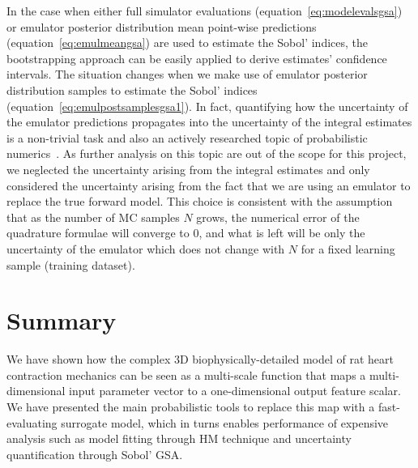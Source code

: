 \vspace{0.2cm}\noindent
In the case when either full simulator evaluations (equation~\eqref{eq:modelevalsgsa}) or emulator posterior distribution mean point-wise predictions (equation~\eqref{eq:emulmeangsa}) are used to estimate the Sobol' indices, the bootstrapping approach can be easily applied to derive estimates' confidence intervals. The situation changes when we make use of emulator posterior distribution samples to estimate the Sobol' indices (equation~\eqref{eq:emulpostsamplesgsa1}). In fact, quantifying how the uncertainty of the emulator predictions propagates into the uncertainty of the integral estimates is a non-trivial task and also an actively researched topic of probabilistic numerics~\cite{Hennig:2015,Oates:2017,Cockayne:2019,Fisher:2019}. As further analysis on this topic are out of the scope for this project, we neglected the uncertainty arising from the integral estimates and only considered the uncertainty arising from the fact that we are using an emulator to replace the true forward model. This choice is consistent with the assumption that as the number of MC samples $N$ grows, the numerical error of the quadrature formulae will converge to $0$, and what is left will be only the uncertainty of the emulator which does not change with $N$ for a fixed learning sample (training dataset).


%
%
%
\section{Summary}\label{sec:ch3summary}
We have shown how the complex $3$D biophysically-detailed model of rat heart contraction mechanics can be seen as a multi-scale function that maps a multi-dimensional input parameter vector to a one-dimensional output feature scalar. We have presented the main probabilistic tools to replace this map with a fast-evaluating surrogate model, which in turns enables performance of expensive analysis such as model fitting through HM technique and uncertainty quantification through Sobol' GSA.